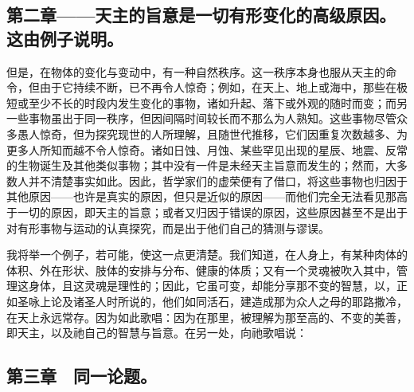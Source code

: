 \subsection{第二章——天主的旨意是一切有形变化的高级原因。这由例子说明。}

但是，在物体的变化与变动中，有一种自然秩序。这一秩序本身也服从天主的命令，但由于它持续不断，已不再令人惊奇；例如，在天上、地上或海中，那些在极短或至少不长的时段内发生变化的事物，诸如升起、落下或外观的随时而变；而另一些事物虽出于同一秩序，但因间隔时间较长而不那么为人熟知。这些事物尽管众多愚人惊奇，但为探究现世的人所理解，且随世代推移，它们因重复次数越多、为更多人所知而越不令人惊奇。诸如日蚀、月蚀、某些罕见出现的星辰、地震、反常的生物诞生及其他类似事物；其中没有一件是未经天主旨意而发生的；然而，大多数人并不清楚事实如此。因此，哲学家们的虚荣便有了借口，将这些事物也归因于其他原因——也许是真实的原因，但只是近似的原因——而他们完全无法看见那高于一切的原因，即天主的旨意；或者又归因于错误的原因，这些原因甚至不是出于对有形事物与运动的认真探究，而是出于他们自己的猜测与谬误。\par

我将举一个例子，若可能，使这一点更清楚。我们知道，在人身上，有某种肉体的体积、外在形状、肢体的安排与分布、健康的体质；又有一个灵魂被吹入其中，管理这身体，且这灵魂是理性的；因此，它虽可变，却能分享那不变的智慧，以，正如圣咏上论及诸圣人时所说的，他们如同活石，建造成那为众人之母的耶路撒冷，在天上永远常存。因为如此歌唱：因为在那里，被理解为那至高的、不变的美善，即天主，以及祂自己的智慧与旨意。在另一处，向祂歌唱说：\par


\subsection{第三章　同一论题。}

